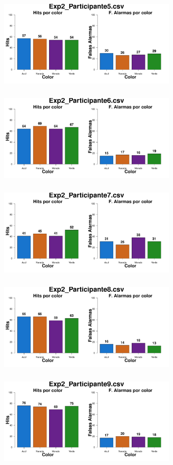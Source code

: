 \documentclass[a4paper ]{article}
\begin{document}
\begin{figure}[th]
\includegraphics[width=9cm, height=5cm]{Figures/Color_Exp2_P5} \includegraphics[width=9cm, height=5cm]{Figures/Color_Exp2_P6}
\includegraphics[width=9cm, height=5cm]{Figures/Color_Exp2_P7} \includegraphics[width=9cm, height=5cm]{Figures/Color_Exp2_P8} 
\includegraphics[width=9cm, height=5cm]{Figures/Color_Exp2_P9}
\end{figure}
\end{document}
